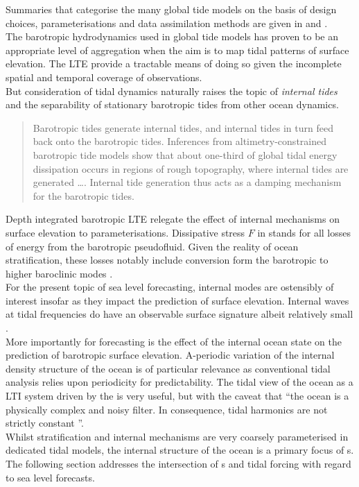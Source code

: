 Summaries that categorise the many global tide models on the basis of design choices, parameterisations and data assimilation methods are given in \cite{Ardalan:2008gs} and \cite{Matsumoto:2000tg}. \\


The barotropic hydrodynamics used in global tide models has proven to be an appropriate level of aggregation when the aim is to map tidal patterns of surface elevation.  The LTE provide a tractable means of doing so given the incomplete spatial and temporal coverage of observations.\\
But consideration of tidal dynamics naturally raises the topic of \emph{internal tides} and the separability of stationary barotropic tides from other ocean dynamics.\\
\begin{quotation}
Barotropic tides generate internal tides, and internal tides in turn feed back onto the barotropic tides. Inferences from altimetry-constrained barotropic tide models show that about one-third of global tidal energy dissipation occurs in regions of rough topography, where internal tides are generated \dots{}. Internal tide generation thus acts as a damping mechanism for the barotropic tides.\citep[pp22]{Arbic:hy}
\end{quotation}
Depth integrated barotropic LTE relegate the effect of internal mechanisms on surface elevation to parameterisations.  Dissipative stress $F$ in \label{E:LTE_momtm} stands for all losses of energy from the barotropic pseudofluid.  Given the reality of ocean stratification, these losses notably include conversion form the barotropic to higher baroclinic modes \cite[pp121] {gill1982atmosphere}. \\



For the present topic of sea level forecasting, internal modes are ostensibly of interest insofar as they impact the prediction of surface elevation.  Internal waves at tidal frequencies do have an observable surface signature albeit relatively small \cite{Ray:2011tj}.\\
More importantly for forecasting is the effect of the internal ocean state on the prediction of barotropic surface elevation.  A-periodic variation of the internal density structure of the ocean is of particular relevance as   conventional tidal analysis relies upon periodicity for predictability.     The tidal view of the ocean as a LTI system driven by the \ATGP{} is very useful, but with the caveat that ``the ocean is a physically complex and noisy filter.  In consequence, tidal harmonics are not strictly constant \citep[197]{Ray:2010jm}''.\\



Whilst stratification and internal mechanisms are very coarsely parameterised in dedicated tidal models, the internal structure of the ocean is a primary focus of \OGCM{}s.   The following section addresses the intersection of \OGCM{}s and tidal forcing with regard to sea level forecasts.


